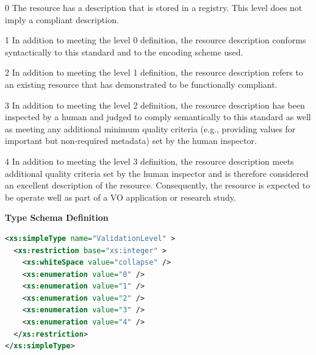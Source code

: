 \documentclass[11pt,a4paper]{ivoa}
\begin{document}
\begin{longtermsdescription}\item[0]
              The resource has a description that is stored in a
              registry. This level does not imply a compliant
              description. 
            
\item[1]
              In addition to meeting the level 0 definition, the
              resource description conforms syntactically to this
              standard and to the encoding scheme used. 
            
\item[2]
              In addition to meeting the level 1 definition, the
              resource description refers to an existing resource that
              has demonstrated to be functionally compliant. 
            
\item[3]
              In addition to meeting the level 2 definition, the
              resource description has been inspected by a human and
              judged to comply semantically to this standard as well
              as meeting any additional minimum quality criteria (e.g.,
              providing values for important but non-required
              metadata) set by the human inspector.
            
\item[4]
              In addition to meeting the level 3 definition, the
              resource description meets additional quality criteria
              set by the human inspector and is therefore considered
              an excellent description of the resource. Consequently,
              the resource is expected to be operate well as part of a
              VO application or research study.
            
\end{longtermsdescription}
\vspace{1ex}\noindent\textbf{ Type Schema Definition}

\begin{lstlisting}[language=XML,basicstyle=\footnotesize]
<xs:simpleType name="ValidationLevel" >
  <xs:restriction base="xs:integer" >
    <xs:whiteSpace value="collapse" />
    <xs:enumeration value="0" />
    <xs:enumeration value="1" />
    <xs:enumeration value="2" />
    <xs:enumeration value="3" />
    <xs:enumeration value="4" />
  </xs:restriction>
</xs:simpleType>
\end{lstlisting}\endgroup
\end{document}
